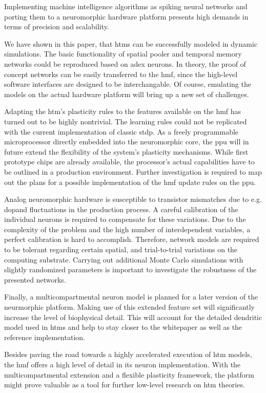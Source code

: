 Implementing machine intelligence algorithms as spiking neural networks and porting them to a neuromorphic hardware platform presents high demands in terms of precision and scalability.

We have shown in this paper, that \glspl{htm} can be successfully modeled in dynamic simulations. The basic functionality of spatial pooler and temporal memory networks could be reproduced based on \gls{adex} neurons. In theory, the proof of concept networks can be easily transferred to the \gls{hmf}, since the high-level software interfaces are designed to be interchangable. Of course, emulating the models on the actual hardware platform will bring up a new set of challenges.

Adapting the \gls{htm}'s plasticity rules to the features available on the \gls{hmf} has turned out to be highly nontrivial. The learning rules could not be replicated with the current implementation of classic \gls{stdp}. As a freely programmable microprocessor directly embedded into the neuromorphic core, the \gls{ppu} will in future extend the flexibility of the system's plasticity mechanisms. While first prototype chips are already available, the processor's actual capabilities have to be outlined in a production environment. Further investigation is required to map out the plans for a possible implementation of the \gls{hmf} update rules on the \gls{ppu}.

Analog neuromorphic hardware is susceptible to transistor mismatches due to e.g. dopand fluctuations in the production process. A careful calibration of the individual neurons is required to compensate for these variations. Due to the complexity of the problem and the high number of interdependent variables, a perfect calibration is hard to accomplish. Therefore, network models are required to be tolerant regarding certain spatial, and trial-to-trial variations on the computing substrate. Carrying out additional Monte Carlo simulations with slightly randomized parameters is important to investigate the robustness of the presented networks.

Finally, a multicompartmental neuron model is planned for a later version of the neurmorphic platform. Making use of this extended feature set will significantly increase the level of biophysical detail. This will account for the detailed dendritic model used in \glspl{htm} and help to stay closer to the whitepaper as well as the reference implementation.

Besides paving the road towards a highly accelerated execution of \gls{htm} models, the \gls{hmf} offers a high level of detail in its neuron implementation. With the multicompartmental extension and a flexible plasticity framework, the platform might prove valuable as a tool for further low-level research on \gls{htm} theories.
